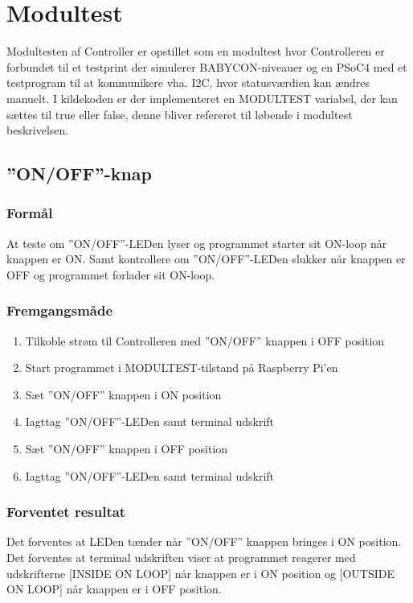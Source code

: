 \section{Modultest}

Modultesten af Controller er opstillet som en modultest hvor Controlleren er forbundet til et testprint der simulerer BABYCON-niveauer og en PSoC4 med et testprogram til at kommunikere vha. I2C, hvor statusværdien kan ændres manuelt. I kildekoden er der implementeret en MODULTEST variabel, der kan sættes til true eller false, denne bliver refereret til løbende i modultest beskrivelsen.

\subsection*{''ON/OFF''-knap}

\subsubsection*{Formål}

At teste om ''ON/OFF''-LEDen lyser og programmet starter sit ON-loop når knappen er ON. Samt kontrollere om ''ON/OFF''-LEDen slukker når knappen er OFF og programmet forlader sit ON-loop.

\subsubsection*{Fremgangsmåde}
\begin{enumerate}
\item Tilkoble strøm til Controlleren med ''ON/OFF'' knappen i OFF position
\item Start programmet i MODULTEST-tilstand på Raspberry Pi'en
\item Sæt ''ON/OFF'' knappen i ON position
\item Iagttag ''ON/OFF''-LEDen samt terminal udskrift
\item Sæt ''ON/OFF'' knappen i OFF position
\item Iagttag ''ON/OFF''-LEDen samt terminal udskrift
\end{enumerate}

\subsubsection*{Forventet resultat} 
Det forventes at LEDen tænder når ''ON/OFF'' knappen bringes i ON position. Det forventes at terminal udskriften viser at programmet reagerer med udskrifterne [INSIDE ON LOOP] når knappen er i ON position og [OUTSIDE ON LOOP] når knappen er i OFF position.

